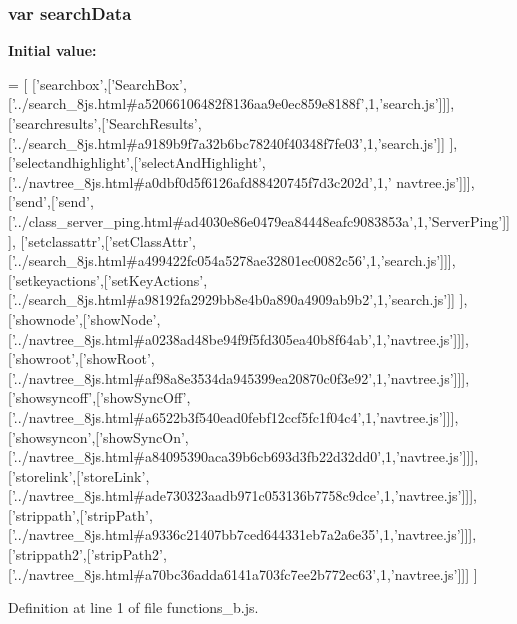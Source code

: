 \subsubsection[{search\+Data}]{\setlength{\rightskip}{0pt plus 5cm}var search\+Data}\label{functions__b_8js_ad01a7523f103d6242ef9b0451861231e}
{\bfseries Initial value\+:}
\begin{DoxyCode}
=
[
  [\textcolor{stringliteral}{'searchbox'},[\textcolor{stringliteral}{'SearchBox'},[\textcolor{stringliteral}{'../search\_8js.html#a52066106482f8136aa9e0ec859e8188f'},1,\textcolor{stringliteral}{'search.js'}]]],
  [\textcolor{stringliteral}{'searchresults'},[\textcolor{stringliteral}{'SearchResults'},[\textcolor{stringliteral}{'../search\_8js.html#a9189b9f7a32b6bc78240f40348f7fe03'},1,\textcolor{stringliteral}{'search.js'}]]
      ],
  [\textcolor{stringliteral}{'selectandhighlight'},[\textcolor{stringliteral}{'selectAndHighlight'},[\textcolor{stringliteral}{'../navtree\_8js.html#a0dbf0d5f6126afd88420745f7d3c202d'},1,\textcolor{stringliteral}{'
      navtree.js'}]]],
  [\textcolor{stringliteral}{'send'},[\textcolor{stringliteral}{'send'},[\textcolor{stringliteral}{'../class\_server\_ping.html#ad4030e86e0479ea84448eafc9083853a'},1,\textcolor{stringliteral}{'ServerPing'}]]],
  [\textcolor{stringliteral}{'setclassattr'},[\textcolor{stringliteral}{'setClassAttr'},[\textcolor{stringliteral}{'../search\_8js.html#a499422fc054a5278ae32801ec0082c56'},1,\textcolor{stringliteral}{'search.js'}]]],
  [\textcolor{stringliteral}{'setkeyactions'},[\textcolor{stringliteral}{'setKeyActions'},[\textcolor{stringliteral}{'../search\_8js.html#a98192fa2929bb8e4b0a890a4909ab9b2'},1,\textcolor{stringliteral}{'search.js'}]]
      ],
  [\textcolor{stringliteral}{'shownode'},[\textcolor{stringliteral}{'showNode'},[\textcolor{stringliteral}{'../navtree\_8js.html#a0238ad48be94f9f5fd305ea40b8f64ab'},1,\textcolor{stringliteral}{'navtree.js'}]]],
  [\textcolor{stringliteral}{'showroot'},[\textcolor{stringliteral}{'showRoot'},[\textcolor{stringliteral}{'../navtree\_8js.html#af98a8e3534da945399ea20870c0f3e92'},1,\textcolor{stringliteral}{'navtree.js'}]]],
  [\textcolor{stringliteral}{'showsyncoff'},[\textcolor{stringliteral}{'showSyncOff'},[\textcolor{stringliteral}{'../navtree\_8js.html#a6522b3f540ead0febf12ccf5fc1f04c4'},1,\textcolor{stringliteral}{'navtree.js'}]]],
  [\textcolor{stringliteral}{'showsyncon'},[\textcolor{stringliteral}{'showSyncOn'},[\textcolor{stringliteral}{'../navtree\_8js.html#a84095390aca39b6cb693d3fb22d32dd0'},1,\textcolor{stringliteral}{'navtree.js'}]]],
  [\textcolor{stringliteral}{'storelink'},[\textcolor{stringliteral}{'storeLink'},[\textcolor{stringliteral}{'../navtree\_8js.html#ade730323aadb971c053136b7758c9dce'},1,\textcolor{stringliteral}{'navtree.js'}]]],
  [\textcolor{stringliteral}{'strippath'},[\textcolor{stringliteral}{'stripPath'},[\textcolor{stringliteral}{'../navtree\_8js.html#a9336c21407bb7ced644331eb7a2a6e35'},1,\textcolor{stringliteral}{'navtree.js'}]]],
  [\textcolor{stringliteral}{'strippath2'},[\textcolor{stringliteral}{'stripPath2'},[\textcolor{stringliteral}{'../navtree\_8js.html#a70bc36adda6141a703fc7ee2b772ec63'},1,\textcolor{stringliteral}{'navtree.js'}]]]
]
\end{DoxyCode}


Definition at line 1 of file functions\+\_\+b.\+js.

